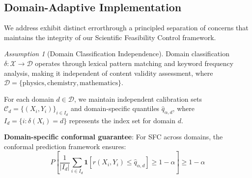 \documentclass{uai2026} %
\theoremstyle{remark}
\newtheorem{assumption}{Assumption}
\theoremstyle{plain}
\theoremstyle{definition}
\begin{document}





\subsection{Domain-Adaptive Implementation}

We address exhibit distinct errorthrough a principled separation of concerns that maintains the integrity of our Scientific Feasibility Control framework.

\begin{assumption}[Domain Classification Independence]
\label{ass:domain-independence}
Domain classification $\delta: \mathcal{X} \rightarrow \mathcal{D}$ operates through lexical pattern matching and keyword frequency analysis, making it independent of content validity assessment, where $\mathcal{D} = \{\text{physics}, \text{chemistry}, \text{mathematics}\}$.
\end{assumption}

For each domain $d \in \mathcal{D}$, we maintain independent calibration sets $\mathcal{C}_d = \{(X_i, Y_i)\}_{i \in I_d}$ and domain-specific quantiles $\hat{q}_{\alpha,d}$, where $I_d = \{i : \delta(X_i) = d\}$ represents the index set for domain $d$.

\textbf{Domain-specific conformal guarantee}: For SFC across domains, the conformal prediction framework ensures:
\begin{equation}
P\left[\frac{1}{|I_d|}\sum_{i \in I_d} \mathbf{1}[r(X_i,Y_i) \leq \hat{q}_{\alpha,d}] \geq 1-\alpha\right] \geq 1-\alpha
\end{equation}
\end{document}
